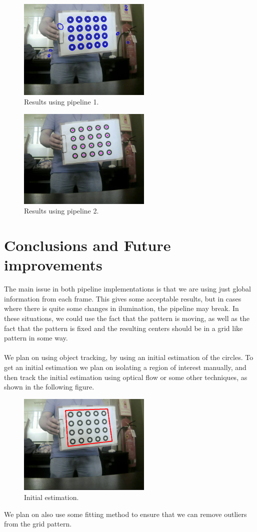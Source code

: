 \documentclass[journal]{IEEEtran}
\begin{document}
\begin{figure}[H]
\centering
\includegraphics[width=2.5in]{_img/img_results_p1.png}
\caption{Results using pipeline 1.}
\end{figure}
%
\begin{figure}[H]
\centering
\includegraphics[width=2.5in]{_img/img_results_p2.png}
\caption{Results using pipeline 2.}
\end{figure}
%
\section{Conclusions and Future improvements}
The main issue in both pipeline implementations is that we are using just global information from each frame. This gives some acceptable results, but in cases where there is quite some changes in ilumination, the pipeline may break. In these situations, we could use the fact that the pattern is moving, as well as the fact that the pattern is fixed and the resulting centers should be in a grid like pattern in some way.
\\
\\
We plan on using object tracking, by using an initial estimation of the circles. To get an initial estimation we plan on isolating a region of interest manually, and then track the initial estimation using optical flow or some other techniques, as shown in the following figure.
\\
\begin{figure}[H]
\centering
\includegraphics[width=2.5in]{_img/img_results_fut_1.png}
\caption{Initial estimation.}
\end{figure}
%
We plan on also use some fitting method to ensure that we can remove outliers from the grid pattern.
\end{document}
